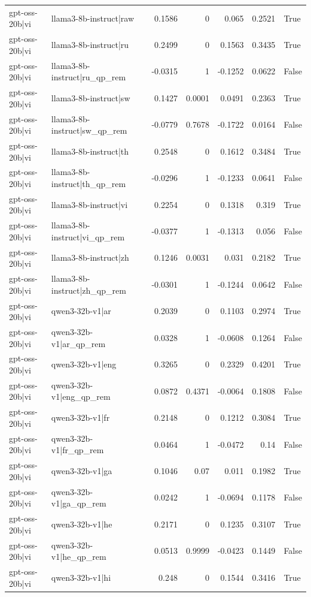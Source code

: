 \begin{table}
\begin{tabular}{l l r r r r l}
gpt-oss-20b|vi & llama3-8b-instruct|raw & 0.1586 & 0 & 0.065 & 0.2521 & True \\
gpt-oss-20b|vi & llama3-8b-instruct|ru & 0.2499 & 0 & 0.1563 & 0.3435 & True \\
gpt-oss-20b|vi & llama3-8b-instruct|ru_qp_rem & -0.0315 & 1 & -0.1252 & 0.0622 & False \\
gpt-oss-20b|vi & llama3-8b-instruct|sw & 0.1427 & 0.0001 & 0.0491 & 0.2363 & True \\
gpt-oss-20b|vi & llama3-8b-instruct|sw_qp_rem & -0.0779 & 0.7678 & -0.1722 & 0.0164 & False \\
gpt-oss-20b|vi & llama3-8b-instruct|th & 0.2548 & 0 & 0.1612 & 0.3484 & True \\
gpt-oss-20b|vi & llama3-8b-instruct|th_qp_rem & -0.0296 & 1 & -0.1233 & 0.0641 & False \\
gpt-oss-20b|vi & llama3-8b-instruct|vi & 0.2254 & 0 & 0.1318 & 0.319 & True \\
gpt-oss-20b|vi & llama3-8b-instruct|vi_qp_rem & -0.0377 & 1 & -0.1313 & 0.056 & False \\
gpt-oss-20b|vi & llama3-8b-instruct|zh & 0.1246 & 0.0031 & 0.031 & 0.2182 & True \\
gpt-oss-20b|vi & llama3-8b-instruct|zh_qp_rem & -0.0301 & 1 & -0.1244 & 0.0642 & False \\
gpt-oss-20b|vi & qwen3-32b-v1|ar & 0.2039 & 0 & 0.1103 & 0.2974 & True \\
gpt-oss-20b|vi & qwen3-32b-v1|ar_qp_rem & 0.0328 & 1 & -0.0608 & 0.1264 & False \\
gpt-oss-20b|vi & qwen3-32b-v1|eng & 0.3265 & 0 & 0.2329 & 0.4201 & True \\
gpt-oss-20b|vi & qwen3-32b-v1|eng_qp_rem & 0.0872 & 0.4371 & -0.0064 & 0.1808 & False \\
gpt-oss-20b|vi & qwen3-32b-v1|fr & 0.2148 & 0 & 0.1212 & 0.3084 & True \\
gpt-oss-20b|vi & qwen3-32b-v1|fr_qp_rem & 0.0464 & 1 & -0.0472 & 0.14 & False \\
gpt-oss-20b|vi & qwen3-32b-v1|ga & 0.1046 & 0.07 & 0.011 & 0.1982 & True \\
gpt-oss-20b|vi & qwen3-32b-v1|ga_qp_rem & 0.0242 & 1 & -0.0694 & 0.1178 & False \\
gpt-oss-20b|vi & qwen3-32b-v1|he & 0.2171 & 0 & 0.1235 & 0.3107 & True \\
gpt-oss-20b|vi & qwen3-32b-v1|he_qp_rem & 0.0513 & 0.9999 & -0.0423 & 0.1449 & False \\
gpt-oss-20b|vi & qwen3-32b-v1|hi & 0.248 & 0 & 0.1544 & 0.3416 & True \\

\end{tabular}
\end{table}
